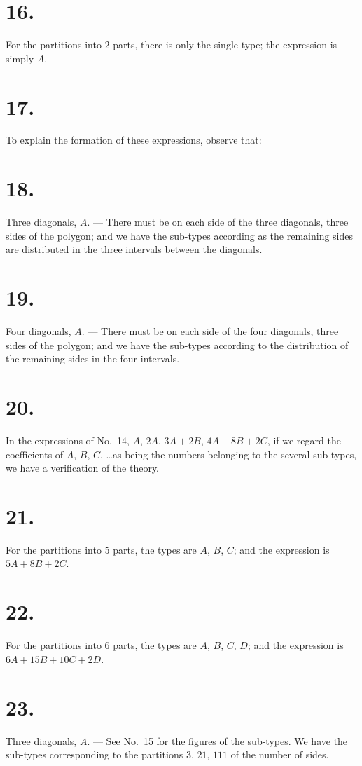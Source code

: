 \documentclass[11pt,a4paper]{article}
\begin{document}
\section*{16.}
For the partitions into $2$ parts, there is only the single type; the expression is simply $A$.

\section*{17.}
To explain the formation of these expressions, observe that:

\section*{18.}
Three diagonals, $A$. --- There must be on each side of the three diagonals, three sides of the polygon; and we have the sub-types according as the remaining sides are distributed in the three intervals between the diagonals.

\section*{19.}
Four diagonals, $A$. --- There must be on each side of the four diagonals, three sides of the polygon; and we have the sub-types according to the distribution of the remaining sides in the four intervals.

\section*{20.}
In the expressions of No.~14, $A$, $2A$, $3A + 2B$, $4A + 8B + 2C$, if we regard the coefficients of $A$, $B$, $C$, \ldots as being the numbers belonging to the several sub-types, we have a verification of the theory.

\section*{21.}
For the partitions into $5$ parts, the types are $A$, $B$, $C$; and the expression is $5A + 8B + 2C$.

\section*{22.}
For the partitions into $6$ parts, the types are $A$, $B$, $C$, $D$; and the expression is $6A + 15B + 10C + 2D$.

\section*{23.}
Three diagonals, $A$. --- See No.~15 for the figures of the sub-types. We have the sub-types corresponding to the partitions $3$, $21$, $111$ of the number of sides.
\end{document}
